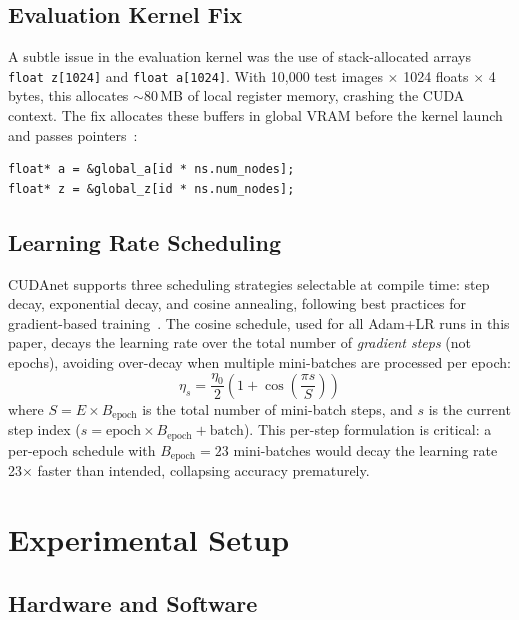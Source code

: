 \documentclass[conference]{IEEEtran}
\begin{document}
\subsection{Evaluation Kernel Fix}

A subtle issue in the evaluation kernel was the use of stack-allocated arrays \texttt{float\,z[1024]} and \texttt{float\,a[1024]}. With 10,000 test images $\times$ 1024 floats $\times$ 4 bytes, this allocates $\sim$80\,MB of local register memory, crashing the CUDA context. The fix allocates these buffers in global VRAM before the kernel launch and passes pointers~\cite{b16}:
\begin{verbatim}
float* a = &global_a[id * ns.num_nodes];
float* z = &global_z[id * ns.num_nodes];
\end{verbatim}

\subsection{Learning Rate Scheduling}

CUDAnet supports three scheduling strategies selectable at compile time: step decay, exponential decay, and cosine annealing, following best practices for gradient-based training~\cite{b9}. The cosine schedule, used for all Adam+LR runs in this paper, decays the learning rate over the total number of \emph{gradient steps} (not epochs), avoiding over-decay when multiple mini-batches are processed per epoch:
\begin{equation}
\eta_s = \frac{\eta_0}{2}\left(1 + \cos\!\left(\frac{\pi s}{S}\right)\right)
\end{equation}
where $S = E \times B_\text{epoch}$ is the total number of mini-batch steps, and $s$ is the current step index ($s = \text{epoch} \times B_\text{epoch} + \text{batch}$). This per-step formulation is critical: a per-epoch schedule with $B_\text{epoch}=23$ mini-batches would decay the learning rate 23$\times$ faster than intended, collapsing accuracy prematurely.

\section{Experimental Setup}

\subsection{Hardware and Software}
\end{document}
